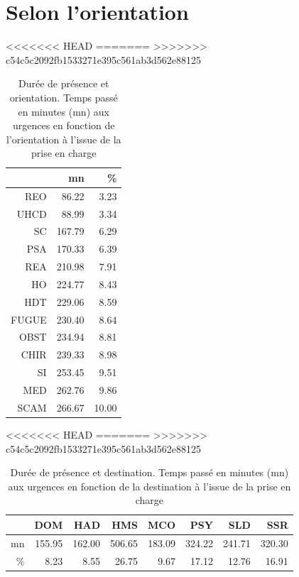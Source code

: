 \documentclass[12pt,english,french,twoside]{book}\usepackage[]{graphicx}\usepackage[]{color}
\begin{document}

\section{Selon l'orientation}
<<<<<<< HEAD
=======
>>>>>>> c54c5c2092fb1533271e395c561ab3d562e88125
\begin{table}[ht]
\centering
\begin{tabular}{rrr}
  \hline
 & mn & \% \\ 
  \hline
REO & 86.22 & 3.23 \\ 
  UHCD & 88.99 & 3.34 \\ 
  SC & 167.79 & 6.29 \\ 
  PSA & 170.33 & 6.39 \\ 
  REA & 210.98 & 7.91 \\ 
  HO & 224.77 & 8.43 \\ 
  HDT & 229.06 & 8.59 \\ 
  FUGUE & 230.40 & 8.64 \\ 
  OBST & 234.94 & 8.81 \\ 
  CHIR & 239.33 & 8.98 \\ 
  SI & 253.45 & 9.51 \\ 
  MED & 262.76 & 9.86 \\ 
  SCAM & 266.67 & 10.00 \\ 
   \hline
\end{tabular}
\caption[Durée de présence et orientation]{Durée de présence et orientation. Temps passé en minutes (mn) aux urgences en fonction de l'orientation à l'issue de la prise en charge} 
\label{tab:duree_orientation}
\end{table}
<<<<<<< HEAD
=======
>>>>>>> c54c5c2092fb1533271e395c561ab3d562e88125
\begin{table}[ht]
\centering
\begin{tabular}{rrrrrrrr}
  \hline
 & DOM & HAD & HMS & MCO & PSY & SLD & SSR \\ 
  \hline
mn & 155.95 & 162.00 & 506.65 & 183.09 & 324.22 & 241.71 & 320.30 \\ 
  \% & 8.23 & 8.55 & 26.75 & 9.67 & 17.12 & 12.76 & 16.91 \\ 
   \hline
\end{tabular}
\caption[Durée de présence et destination]{Durée de présence et destination. Temps passé en minutes (mn) aux urgences en fonction de la destination à l'issue de la prise en charge} 
\label{tab:duree_destination}
\end{table}
\end{document}
